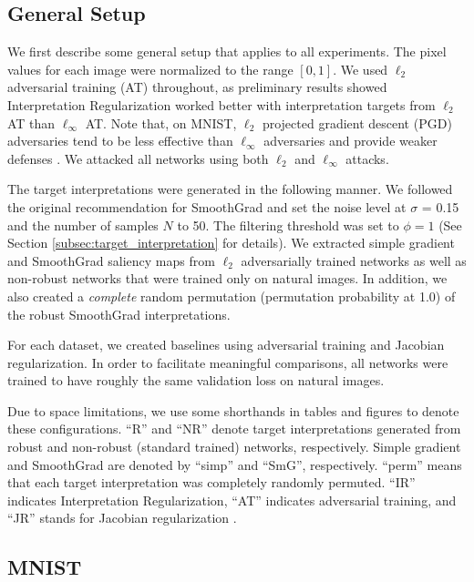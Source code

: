 \subsection{General Setup}
We first describe some general setup that applies to all experiments. The pixel values for each image were normalized to the range $[0,1]$. We used $\ell_{2}$ adversarial training (AT) throughout, as preliminary results showed Interpretation Regularization worked better with interpretation targets from $\ell_{2}$ AT than $\ell_{\infty}$ AT. Note that, on MNIST, $\ell_2$ projected gradient descent (PGD) adversaries tend to be less effective than $\ell_{\infty}$ adversaries and provide weaker defenses \cite{toward_robust_dnn,l2mnist}. We attacked all networks using both $\ell_{2}$ and $\ell_{\infty}$ attacks. 

The target interpretations were generated in the following manner. We followed the original recommendation for SmoothGrad \cite{smoothgrad} and set the noise level at $\sigma$ = 0.15 and the number of samples $N$ to 50. The filtering threshold was set to $\phi=1$ (See Section \ref{subsec:target_interpretation} for details). We extracted simple gradient and SmoothGrad saliency maps from $\ell_2$ adversarially trained networks as well as non-robust networks that were trained only on natural images. In addition, we also created a \textit{complete} random permutation (permutation probability at 1.0) of the robust SmoothGrad interpretations. 

%
For each dataset, we created baselines using adversarial training and  Jacobian regularization. In order to facilitate meaningful comparisons, all networks were trained to have roughly the same validation loss on natural images. 

Due to space limitations, we use some shorthands in tables and figures to denote these configurations. ``R'' and ``NR'' denote target interpretations generated from robust and non-robust (standard trained) networks, respectively. Simple gradient and SmoothGrad are denoted by ``simp'' and ``SmG'', respectively. ``perm'' means that each target interpretation was completely randomly permuted. ``IR'' indicates Interpretation Regularization, ``AT'' indicates adversarial training, and ``JR'' stands for Jacobian regularization \cite{jacobian_reg_approx}.

\subsection{MNIST} \label{subsec:mnist_experiments}

